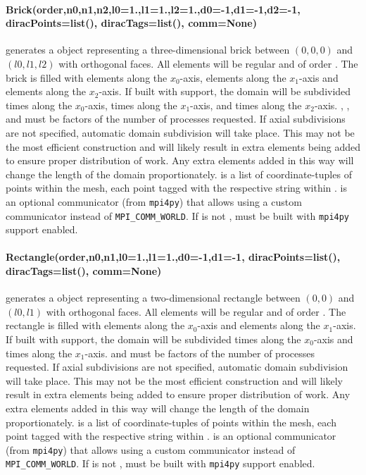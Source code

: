 \paragraph{Brick(order,n0,n1,n2,l0=1.,l1=1.,l2=1.,d0=-1,d1=-1,d2=-1,
diracPoints=list(), diracTags=list(), comm=None)}
generates a \Domain object representing a three-dimensional brick between
$(0,0,0)$ and $(l0,l1,l2)$ with orthogonal faces. All elements will be regular
and of order . The brick is filled with
 elements along the $x_0$-axis,
 elements along the $x_1$-axis and
 elements along the $x_2$-axis.
If built with \MPI support, the domain will be subdivided
 times along the $x_0$-axis,
 times along the $x_1$-axis, and
 times along the $x_2$-axis.
, , and  must be factors of the number of
\MPI processes requested.
If axial subdivisions are not specified, automatic domain subdivision will take
place. This may not be the most efficient construction and will likely result in
extra elements being added to ensure proper distribution of work. Any extra
elements added in this way will change the length of the domain proportionately.
 is a list of coordinate-tuples of points within the mesh,
each point tagged with the respective string within .
 is an optional \MPI communicator (from \texttt{mpi4py}) that allows using a custom
communicator instead of \texttt{MPI\_COMM\_WORLD}. If  is not ,
\escript must be built with \texttt{mpi4py} support enabled.


\paragraph{Rectangle(order,n0,n1,l0=1.,l1=1.,d0=-1,d1=-1,
diracPoints=list(), diracTags=list(), comm=None)}
generates a \Domain object representing a two-dimensional rectangle between
$(0,0)$ and $(l0,l1)$ with orthogonal faces. All elements will be regular
and of order . The rectangle is filled with
 elements along the $x_0$-axis and
 elements along the $x_1$-axis.
If built with \MPI support, the domain will be subdivided
 times along the $x_0$-axis and
 times along the $x_1$-axis.
 and  must be factors of the number of \MPI processes requested.
If axial subdivisions are not specified, automatic domain subdivision will take
place. This may not be the most efficient construction and will likely result in
extra elements being added to ensure proper distribution of work. Any extra
elements added in this way will change the length of the domain proportionately.
 is a list of coordinate-tuples of points within the mesh,
each point tagged with the respective string within .
 is an optional \MPI communicator (from \texttt{mpi4py}) that allows using a custom
communicator instead of \texttt{MPI\_COMM\_WORLD}. If  is not ,
\escript must be built with \texttt{mpi4py} support enabled.

